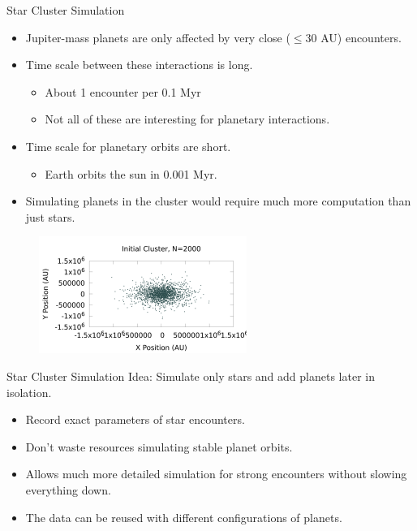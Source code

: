 \documentclass{beamer}
\begin{document}
\begin{frame}{Star Cluster Simulation}
    \begin{itemize}
        \item Jupiter-mass planets are only affected by very close ($\le $30 AU) encounters.
        \item Time scale between these interactions is long.
            \begin{itemize}
                \item About 1 encounter per 0.1 Myr
                \item Not all of these are interesting for planetary interactions.
            \end{itemize}
        \item Time scale for planetary orbits are short.
            \begin{itemize}
                \item Earth orbits the sun in 0.001 Myr.
            \end{itemize}
        \item Simulating planets in the cluster would require much more
            computation than just stars.
    \end{itemize}
    \begin{figure}
        \includegraphics[height=1.5in]{slides/cluster_n2000.png}
    \end{figure}
\end{frame}

\begin{frame}{Star Cluster Simulation}
    Idea: Simulate only stars and add planets later in isolation.
    \begin{itemize}
        \item Record exact parameters of star encounters.
        \item Don't waste resources simulating stable planet orbits.
        \item Allows much more detailed simulation for strong encounters
            without slowing everything down.
        \item The data can be reused with different configurations of planets.
    \end{itemize}
\end{frame}
\end{document}
